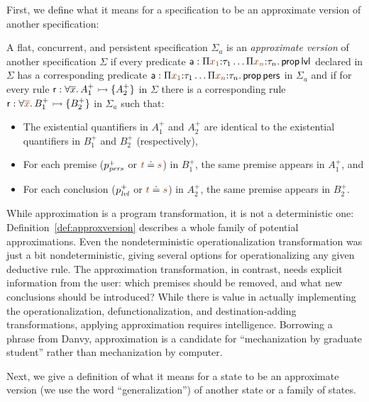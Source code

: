 First, we define what it means for a specification to be an approximate
version of another specification:

\bigskip
\begin{definition}\label{def:approxversion}
  A flat, concurrent, and persistent specification $\Sigma_a$ is an
  {\em approximate version} of another specification $\Sigma$ if every
  predicate ${\sf a} : \Pi \lf{x_1}{:}\tau_1 \ldots \Pi \lf{x_n}{:}\tau_n.\,
  {\sf prop}\,{\sf lvl}$ declared in $\Sigma$ has a corresponding
  predicate ${\sf a} : \Pi \lf{x_1}{:}\tau_1 \ldots \Pi \lf{x_n}{:}\tau_n.\,
  {\sf prop}\,{\sf pers}$ in $\Sigma_a$ and if for every rule ${\sf
    r} : \forall \overline{x}.\,A_1^+ \rightarrowtail \{ A_2^+ \}$ in $\Sigma$ there
  is a corresponding rule ${\sf r} : \forall \lf{\overline{x}}.\,B_1^+ \lefti
  \{ B_2^+ \}$ in $\Sigma_a$ such that:
  \begin{itemize}
  \item The existential quantifiers in $A_1^+$ and $A_2^+$ are
    identical to the existential quantifiers in $B_1^+$ and $B_2^+$
    (respectively),
  \item For each premise ($p^+_{\it pers}$ or $\lf{t} \doteq \lf{s}$) in $B^+_1$,
    the same premise appears in $A^+_1$, and 
  \item For each conclusion ($p^+_{\it lvl}$ or $\lf{t}
    \doteq \lf{s}$) in $A^+_2$, the same premise appears in $B^+_2$.
  \end{itemize}
\end{definition}
\bigskip

\noindent
While approximation is a program transformation, it is not a
deterministic one: Definition~\ref{def:approxversion} describes a
whole family of potential approximations. Even the nondeterministic
operationalization transformation was just a bit nondeterministic,
giving several options for operationalizing any given deductive
rule. The approximation transformation, in contrast, needs explicit
information from the user: which premises should be removed, and what
new conclusions should be introduced? While there is value in actually
implementing the operationalization, defunctionalization, and
destination-adding transformations, applying approximation requires
intelligence. Borrowing a phrase from Danvy, approximation is a
candidate for ``mechanization by graduate student'' rather than
mechanization by computer.

Next, we give a definition of what it means for a state to be an 
approximate version (we use the word ``generalization'') of another state
or a family of states. 


